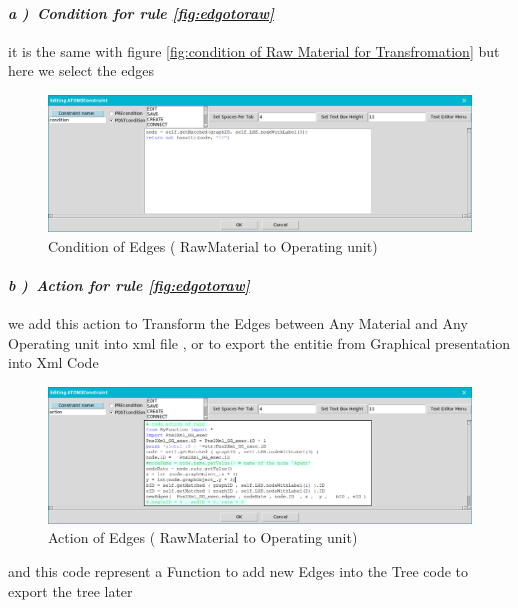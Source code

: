 \paragraph{\emph{ a )~Condition for rule \ref{fig:edgotoraw} } } it is the same with figure \ref{fig:condition of Raw Material for Transfromation} but here we select the edges

\vspace{1cm} 
\begin{figure}[th]
	\centering  %
 	\includegraphics[scale=0.38]{Chapiter3/img/xcond2}
	\caption{\label{fig:Condition2)}Condition of Edges ( RawMaterial to Operating unit)}
 \end{figure} 
\vspace{1cm}
\paragraph{\emph{ b )~Action for rule \ref{fig:edgotoraw} } }  we add this action to  Transform the Edges between Any Material and Any Operating unit into xml file  , or to export the entitie from Graphical presentation 
into Xml Code  
\pagebreak 


\begin{figure}[th]
	\centering  %
 	\includegraphics[scale=0.38]{Chapiter3/img/xact2}
	\caption{\label{fig:action2)}Action of Edges ( RawMaterial to Operating unit)}
\end{figure}  

and this code represent a Function to add new Edges into the Tree code 
to export the tree later 

